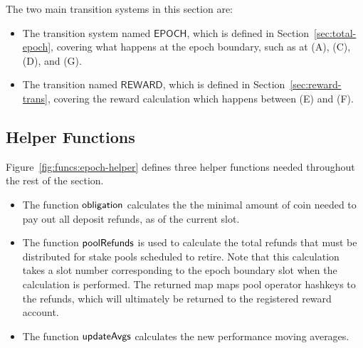 The two main transition systems in this section are:
\begin{itemize}
  \item The transition system named $\mathsf{EPOCH}$, which is defined in
    Section~\ref{sec:total-epoch}, covering what happens at the epoch boundary,
    such as at (A), (C), (D), and (G).
  \item The transition named $\mathsf{REWARD}$, which is defined in Section~\ref{sec:reward-trans},
    covering the reward calculation which happens between (E) and (F).
\end{itemize}

\subsection{Helper Functions}
\label{sec:stake-dist}

Figure~\ref{fig:funcs:epoch-helper} defines three helper functions needed
throughout the rest of the section.

\begin{itemize}
  \item The function $\mathsf{obligation}$ calculates the the minimal amount of coin needed to
    pay out all deposit refunds, as of the current slot.
  \item The function $\mathsf{poolRefunds}$ is used to calculate the total refunds
    that must be distributed for stake pools scheduled to retire.
    Note that this calculation takes a slot number corresponding to the epoch boundary slot
    when the calculation is performed.  The returned map maps pool operator hashkeys to the
    refunds, which will ultimately be returned to the registered reward account.
  \item The function $\mathsf{updateAvgs}$ calculates the new performance moving averages.
\end{itemize}


